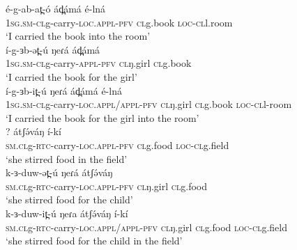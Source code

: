 \ea
\ea	\gll é-g-ab-at̪-ó 				ád̪ámá 		é-lná  \\
		1\textsc{sg.sm-cl}g-carry-\textsc{loc.appl-\textsc{pfv}}	\textsc{cl}g.book	\textsc{loc-cl}l.room\\
		\trans ‘I carried the book into the room’\\

\ex	\gll í-g-ɜb-ət̪-ú 			ŋeɾá 		ád̪ámá  \\
		1\textsc{sg.sm-cl}g-carry-\textsc{appl-\textsc{pfv}}	\textsc{cl}ŋ.girl		\textsc{cl}g.book	\\
	 	\trans ‘I carried the book for the girl’\\

\ex	\gll í-g-ɜb-it̪-ú 				ŋeɾá 		ád̪ámá 		é-lná  \\
	1\textsc{sg.sm-cl}g-carry-\textsc{loc.appl/appl-\textsc{pfv}}	\textsc{cl}ŋ.girl		\textsc{cl}g.book	\textsc{loc-cl}l-room\\
	\trans ‘I carried the book for the girl into the room’\\

\ex	\gll	?		átʃə́váŋ 		í-kí	\\
		\textsc{sm.cl}g-\textsc{rtc}-carry-\textsc{loc.appl-\textsc{pfv}}	\textsc{cl}g.food	\textsc{loc-cl}g.field\\
		\trans ‘she stirred food in the field’\\

\ex \gll	k-ɜ-duw-ət̪-ú 			ŋeɾá 		átʃə́váŋ\\
		\textsc{sm.cl}g-\textsc{rtc}-carry-\textsc{loc.appl-\textsc{pfv}}	\textsc{cl}ŋ.girl		\textsc{cl}g.food	\\ 
		\trans ‘she stirred food for the child’ \\

\ex	\gll k-ɜ-duw-it̪-ú 			ŋeɾa 		átʃə́váŋ 		í-kí\\
	\textsc{sm.cl}g-\textsc{rtc}-carry-\textsc{loc.appl/appl-\textsc{pfv}}	\textsc{cl}ŋ.girl		\textsc{cl}g.food	\textsc{loc-cl}g.field	\\
		\trans ‘she stirred food for the child in the field’ \\
\z
\z
%

